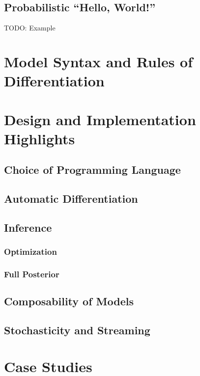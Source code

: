 \documentclass[sigplan,review,10pt,anonymous]{acmart}
\begin{document}
\begin{sloppypar}
\subsection{Probabilistic ``Hello, World!''}

TODO: Example

\section{Model Syntax and Rules of Differentiation}

\section{Design and Implementation Highlights}

\subsection{Choice of Programming Language}

\subsection{Automatic Differentiation}

\subsection{Inference}

\subsubsection{Optimization}

\subsubsection{Full Posterior}

\subsection{Composability of Models}

\subsection{Stochasticity and Streaming}

\section{Case Studies}


\end{sloppypar}
\end{document}
